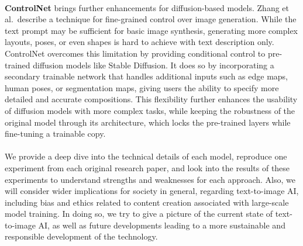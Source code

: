 \\
\noindent
\textbf{ControlNet} brings further enhancements for diffusion-based models. Zhang et al.\ describe a technique for fine-grained control over image generation. While the text prompt may be sufficient for basic image synthesis, generating more complex layouts, poses, or even shapes is hard to achieve with text description only. ControlNet overcomes this limitation by providing conditional control to pre-trained diffusion models like Stable Diffusion. It does so by incorporating a secondary trainable network that handles additional inputs such as edge maps, human poses, or segmentation maps, giving users the ability to specify more detailed and accurate compositions. This flexibility further enhances the usability of diffusion models with more complex tasks, while keeping the robustness of the original model through its architecture, which locks the pre-trained layers while fine-tuning a trainable copy.
\\
\\
\noindent
We provide a deep dive into the technical details of each model, reproduce one experiment from each original research paper, and look into the results of these experiments to understand strengths and weaknesses for each approach. Also, we will consider wider implications for society in general, regarding text-to-image AI, including bias and ethics related to content creation associated with large-scale model training. In doing so, we try to give a picture of the current state of text-to-image AI, as well as future developments leading to a more sustainable and responsible development of the technology.